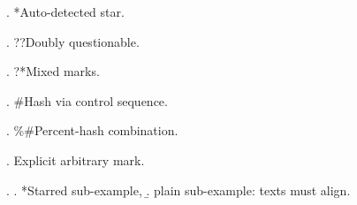 

\ex. *Auto-detected star.

\ex. ??Doubly questionable.

\ex. ?*Mixed marks.

\ex. \#Hash via control sequence.

\ex. \%\#Percent-hash combination.

\ex. \jdg{\dag}Explicit arbitrary mark.

\ex.
\a. *Starred sub-example,
\b. plain sub-example: texts must align.

